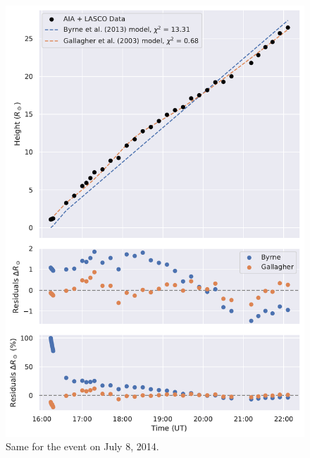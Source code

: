 \begin{figure}[!htp]
	\centering
	\includegraphics[width=0.8\hsize]{chapter2/figs/appendix/height_profile_residuals_aia_lasco_140708_01.pdf}
	\caption{Same for the event on July 8, 2014.}
\end{figure}

